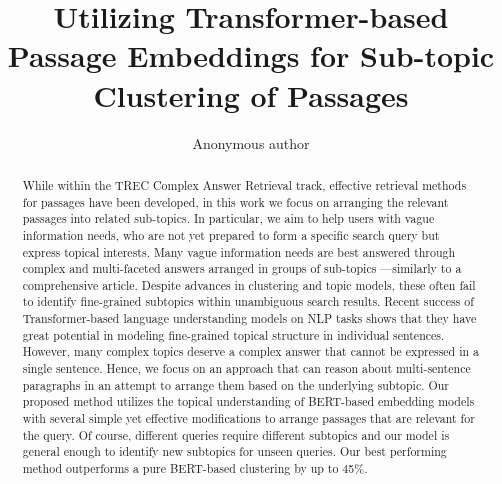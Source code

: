 \documentclass[sigconf,authordraft]{acmart}
\begin{document}
\title{Utilizing Transformer-based Passage Embeddings for Sub-topic Clustering of Passages}


\author{Anonymous author}

\renewcommand{\shortauthors}{}

\begin{abstract}
While within the TREC Complex Answer Retrieval track, effective retrieval methods for passages have been developed, in this work we focus on arranging the relevant passages into related sub-topics. In particular, we aim to help users with vague information needs, who are not yet prepared to form a specific search query but express topical interests. Many vague information needs are best answered through complex and multi-faceted answers arranged in groups of sub-topics ---similarly to a comprehensive article. Despite advances in clustering and topic models, these often fail to identify fine-grained subtopics within unambiguous search results. Recent success of Transformer-based language understanding models on NLP tasks shows that they have great potential in modeling fine-grained topical structure in individual sentences. However, many complex topics deserve a complex answer that cannot be expressed in a single sentence. Hence, we focus on an approach that can reason about multi-sentence paragraphs in an attempt to arrange them based on the underlying subtopic. Our proposed method utilizes the topical understanding of BERT-based embedding models with several simple yet effective modifications to arrange passages that are relevant for the query. Of course, different queries require different subtopics and our model is general enough to identify new subtopics for unseen queries. Our best performing method outperforms a pure BERT-based clustering by up to 45\%.
\end{abstract}
\end{document}
